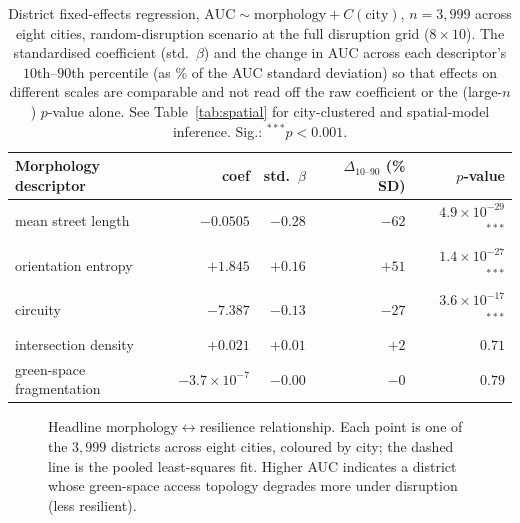 \documentclass[sn-mathphys-num,pdflatex]{sn-jnl}
\begin{document}
\begin{table}[t]\centering
\caption{District fixed-effects regression, $\mathrm{AUC}\sim\text{morphology}+C(\text{city})$,
$n=3{,}999$ across eight cities, random-disruption scenario at the full disruption
grid ($8\times10$). The standardised coefficient (std.\ $\beta$) and the
change in AUC across each descriptor's $10$th--$90$th percentile (as \% of the AUC
standard deviation) so that effects on different scales are comparable and not read
off the raw coefficient or the (large-$n$) $p$-value alone. See Table~\ref{tab:spatial}
for city-clustered and spatial-model inference. Sig.: $^{***}p<0.001$.}
\label{tab:regression}
\begin{tabular}{lrrrr}
\toprule
Morphology descriptor & coef & std.\ $\beta$ & $\Delta_{10\text{--}90}$ (\% SD) & $p$-value\\
\midrule
mean street length & $-0.0505$ & $-0.28$ & $-62$ & $4.9\times10^{-29}$ $^{***}$\\
orientation entropy & $+1.845$ & $+0.16$ & $+51$ & $1.4\times10^{-27}$ $^{***}$\\
circuity & $-7.387$ & $-0.13$ & $-27$ & $3.6\times10^{-17}$ $^{***}$\\
intersection density & $+0.021$ & $+0.01$ & $+2$ & $0.71$\\
green-space fragmentation & $-3.7\times10^{-7}$ & $-0.00$ & $-0$ & $0.79$\\
\bottomrule
\end{tabular}
\end{table}

\begin{figure}[t]\centering
{}
\caption{Headline morphology$\leftrightarrow$resilience relationship. Each point
is one of the $3{,}999$ districts across eight cities, coloured by city; the dashed
line is the pooled least-squares fit. Higher AUC indicates a district whose
green-space access topology degrades more under disruption (less resilient).}
\label{fig:morphology}
\end{figure}
\end{document}
